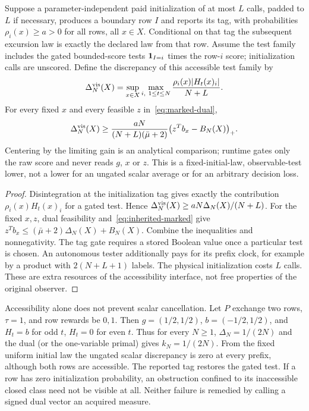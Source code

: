 \begin{proposition}\label{prop:access}
Suppose a parameter-independent paid initialization of at most $L$ calls, padded to $L$ if necessary, produces a boundary row $I$ and reports its tag, with probabilities $\rho_i(x)\ge a>0$ for all rows, all $x\in X$. Conditional on that tag the subsequent excursion law is exactly the declared law from that row. Assume the test family includes the gated bounded-score tests $\mathbf 1_{I=i}$ times the row-$i$ score; initialization calls are unscored. Define the discrepancy of this accessible test family by
\[
 \Delta_N^{\rm vis}(X)=\sup_{x\in X}\max_{i,\ 1\le t\le N}
 \frac{\rho_i(x)|H_t(x)_i|}{N+L}.
\]
For every fixed $x$ and every feasible $z$ in~\eqref{eq:marked-dual},
\begin{equation}\label{eq:access-lower}
 \Delta_N^{\rm vis}(X)\ge
 \frac{aN}{(N+L)(\bar\mu+2)}\bigl(z^Tb_x-B_N(X)\bigr)_+.
\end{equation}
Centering by the limiting gain is an analytical comparison; runtime gates only the raw score and never reads $g$, $x$ or $z$. This is a fixed-initial-law, observable-test lower, not a lower for an ungated scalar average or for an arbitrary decision loss.
\end{proposition}
\begin{proof}
Disintegration at the initialization tag gives exactly the contribution $\rho_i(x)H_t(x)_i$ for a gated test. Hence $\Delta_N^{\rm vis}(X)\ge aN\Delta_N(X)/(N+L)$. For the fixed $x,z$, dual feasibility and~\eqref{eq:inherited-marked} give $z^Tb_x\le (\bar\mu+2)\Delta_N(X)+B_N(X)$. Combine the inequalities and nonnegativity. The tag gate requires a stored Boolean value once a particular test is chosen. An autonomous tester additionally pays for its prefix clock, for example by a product with $2(N+L+1)$ labels. The physical initialization costs $L$ calls. These are extra resources of the accessibility interface, not free properties of the original observer.
\end{proof}
Accessibility alone does not prevent scalar cancellation. Let $P$ exchange two rows, $\tau=1$, and row rewards be $0,1$. Then $g=(1/2,1/2)$, $b=(-1/2,1/2)$, and $H_t=b$ for odd $t$, $H_t=0$ for even $t$. Thus for every $N\ge1$, $\Delta_N=1/(2N)$ and the dual (or the one-variable primal) gives $k_N=1/(2N)$. From the fixed uniform initial law the ungated scalar discrepancy is zero at every prefix, although both rows are accessible. The reported tag restores the gated test. If a row has zero initialization probability, an obstruction confined to its inaccessible closed class need not be visible at all. Neither failure is remedied by calling a signed dual vector an acquired measure.

